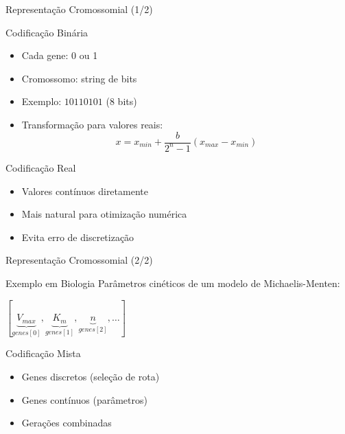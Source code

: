 \begin{frame}{Representação Cromossomial (1/2)}
\begin{block}{Codificação Binária}
\begin{itemize}
    \item Cada gene: 0 ou 1
    \item Cromossomo: string de bits
    \item Exemplo: $10110101$ (8 bits)
    \item Transformação para valores reais:
    $$x = x_{min} + \frac{b}{2^n-1}(x_{max} - x_{min})$$
\end{itemize}
\end{block}

\vspace{0.3cm}
\begin{block}{Codificação Real}
\begin{itemize}
    \item Valores contínuos diretamente
    \item Mais natural para otimização numérica
    \item Evita erro de discretização
\end{itemize}
\end{block}
\end{frame}

\begin{frame}{Representação Cromossomial (2/2)}
\begin{block}{Exemplo em Biologia}
Parâmetros cinéticos de um modelo de Michaelis-Menten:
\begin{center}
$[\underbrace{V_{max}}_{genes[0]}, \underbrace{K_m}_{genes[1]}, \underbrace{n}_{genes[2]}, \ldots]$
\end{center}
\end{block}

\vspace{0.2cm}
\begin{block}{Codificação Mista}
\begin{itemize}
    \item Genes discretos (seleção de rota)
    \item Genes contínuos (parâmetros)
    \item Gerações combinadas
\end{itemize}
\end{block}
\end{frame}

